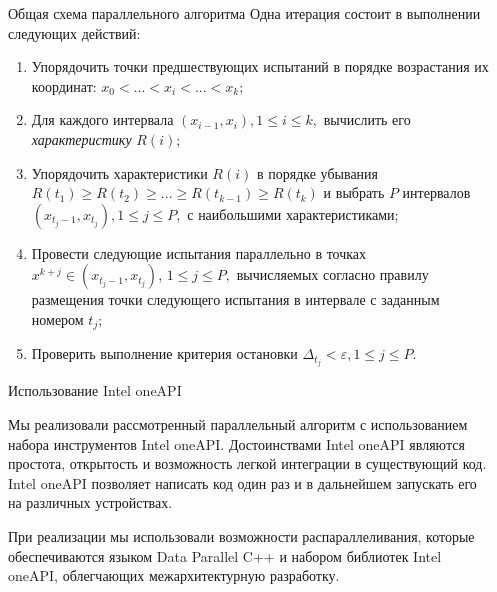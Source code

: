 \documentclass{beamer}
\begin{document}
\begin{frame}[t]
\begin{columns}[t]
\begin{column}[t]{0.465\paperwidth}
        \end{column}
        \begin{column}[t]{0.47\paperwidth}
          \begin{block}{Общая схема параллельного алгоритма}
\leftskip=0.5cm \rightskip=0.5cm 
\setlength{\parindent}{1.25cm} %
Одна итерация состоит в выполнении следующих действий:
              \begin{enumerate}
              \leftskip=0.5cm \rightskip=0.5cm 
\setlength{\parindent}{1.25cm} %
                \justifying
                \item Упорядочить точки предшествующих испытаний в порядке возрастания их координат: \(x_{0}<...<x_{i}<...<x_{k}\);
                \item Для каждого интервала \((x_{i-1}, x_{i}),1\leqslant i\leqslant k,\) вычислить его \textit{характеристику} \(R(i)\);
                \item Упорядочить характеристики \(R(i)\) в порядке убывания \(R(t_{1})\geqslant R(t_{2})\geqslant ... \geqslant  R(t_{k-1})\geqslant R(t_{k})\) и выбрать \(P\) интервалов \((x_{t_j-1}, x_{t_j}), 1\leqslant j \leqslant P,\) с наибольшими характеристиками;
                \item Провести следующие испытания параллельно в точках  \(x^{k+j} \in (x_{t_j-1}, x_{t_j})\), \(1\leqslant j \leqslant P,\) вычисляемых согласно правилу размещения точки следующего испытания в интервале с заданным номером \(t_j\);
                \item Проверить выполнение критерия остановки \(\Delta_{t_j}<\varepsilon, 1\leqslant j \leqslant P\).
              \end{enumerate}

\end{block}

\begin{block}{Использование Intel oneAPI}

\leftskip=0.5cm \rightskip=0.5cm 
\setlength{\parindent}{1.25cm} %
Мы реализовали рассмотренный параллельный алгоритм с использованием набора инструментов Intel oneAPI. Достоинствами Intel oneAPI являются простота, открытость и возможность легкой интеграции в существующий код. Intel oneAPI позволяет написать код один раз и в дальнейшем запускать его на различных устройствах. 

При реализации мы использовали возможности распараллеливания, которые обеспечиваются языком Data Parallel C++ и набором библиотек Intel oneAPI, облегчающих межархитектурную разработку.   



\end{block}
\end{column}
\end{columns}
\end{frame}
\end{document}
